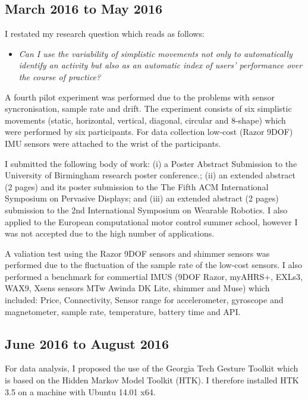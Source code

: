 \documentclass[11pt,journal,onecolumn,compsoc]{IEEEtran}
\begin{document}
\subsection{March 2016 to May 2016}

I restated my research question which reads as follows:
\begin{itemize}
 \item \textit{Can I use the variability of simplistic movements not only to automatically identify
an activity but also as an automatic index of users' performance over the course of practice?}
\end{itemize}


A fourth pilot experiment was performed due to the problems with sensor syncronisation, sample rate and drift.
The experiment consists of six simplistic movements 
(static, horizontal, vertical, diagonal, circular and 8-shape)
which were performed by six participants. 
For data collection low-cost (Razor 9DOF) IMU sensors were attached to the wrist of the participants.

I submitted the following body of work:
(i) a Poster Abstract Submission to the University of Birmingham research poster conference.;
(ii) an extended abstract (2 pages)  and its poster submission to the The Fifth ACM International 
Symposium on Pervasive Displays; and
(iii) an extended abstract (2 pages) submission to the 2nd International Symposium on Wearable Robotics.
I also applied to the European computational motor control summer school,
however I was not accepted due to the high number of applications.

A valiation test using the Razor 9DOF sensors and shimmer sensors
was performed 
due to the fluctuation of the sample rate of the low-cost sensors.
I also performed a benchmark for commertial IMUS
(9DOF Razor, myAHRS+, EXLs3, WAX9, Xsens sensors MTw Awinda DK Lite, shimmer and Muse)
which included:
Price, Connectivity, Sensor range for accelerometer, gyroscope and magnetometer, 
sample rate, temperature, battery time and API.



\subsection{June 2016 to August 2016}

For data analysis, I proposed the use of the Georgia Tech Gesture Toolkit \cite{Westeyn2003}
which is based on the Hidden Markov Model Toolkit (HTK).
I therefore installed HTK 3.5 on a machine with Ubuntu 14.01 x64.
\end{document}
